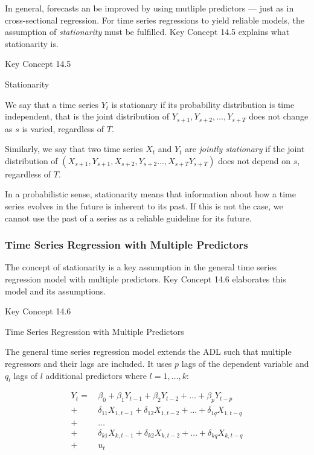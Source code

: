 \documentclass[]{book}
\theoremstyle{definition}
\theoremstyle{definition}
\theoremstyle{definition}
\theoremstyle{remark}
\begin{document}
In general, forecasts an be improved by using mutliple predictors ---
just as in cross-sectional regression. For time series regressions to
yield reliable models, the assumption of \emph{stationarity} must be
fulfilled. Key Concept 14.5 explains what stationarity is.

Key Concept 14.5

Stationarity

We say that a time series \(Y_t\) is stationary if its probability
distribution is time independent, that is the joint distribution of
\(Y_{s+1}, Y_{s+2},\dots,Y_{s+T}\) does not change as \(s\) is varied,
regardless of \(T\).

Similarly, we say that two time series \(X_t\) and \(Y_t\) are
\emph{jointly stationary} if the joint distribution of
\((X_{s+1},Y_{s+1}, X_{s+2},Y_{s+2} \dots, X_{s+T}Y_{s+T})\) does not
depend on \(s\), regardless of \(T\).

In a probabilistic sense, stationarity means that information about how
a time series evolves in the future is inherent to its past. If this is
not the case, we cannot use the past of a series as a reliable guideline
for its future.

\subsubsection*{Time Series Regression with Multiple
Predictors}\label{time-series-regression-with-multiple-predictors}

The concept of stationarity is a key assumption in the general time
series regression model with multiple predictors. Key Concept 14.6
elaborates this model and its assumptions.

Key Concept 14.6

Time Series Regression with Multiple Predictors

The general time series regression model extends the ADL such that
multiple regressors and their lags are included. It uses \(p\) lags of
the dependent variable and \(q_l\) lags of \(l\) additional predictors
where \(l=1,\dots,k\):

\begin{equation}
  \begin{aligned}
  Y_t =& \, \beta_0 + \beta_1 Y_{t-1} + \beta_2 Y_{t-2} + \dots + \beta_{p} Y_{t-p} \\
      +& \, \delta_{11} X_{1,t-1} + \delta_{12} X_{1,t-2} + \dots + \delta_{1q} X_{1,t-q} \\
      +& \, \dots \\
      +& \, \delta_{k1} X_{k,t-1} + \delta_{k2} X_{k,t-2} + \dots + \delta_{kq} X_{k,t-q} \\
      +& \, u_t 
\end{aligned}
\end{equation}
\end{document}

